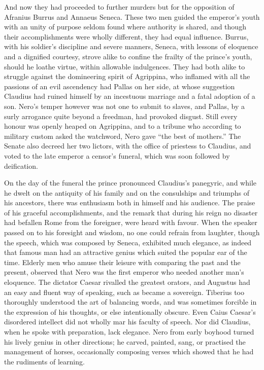 
And now they had proceeded to further murders but for the opposition of Afranius Burrus and Annaeus Seneca. These two men guided the emperor's youth with an unity of purpose seldom found where authority is shared, and though their accomplishments were wholly different, they had equal influence. Burrus, with his soldier's discipline and severe manners, Seneca, with lessons of eloquence and a dignified courtesy, strove alike to confine the frailty of the prince's youth, should he loathe virtue, within allowable indulgences. They had both alike to struggle against the domineering spirit of Agrippina, who inflamed with all the passions of an evil ascendency had Pallas on her side, at whose suggestion Claudius had ruined himself by an incestuous marriage and a fatal adoption of a son. Nero's temper however was not one to submit to slaves, and Pallas, by a surly arrogance quite beyond a freedman, had provoked disgust. Still every honour was openly heaped on Agrippina, and to a tribune who according to military custom asked the watchword, Nero gave ``the best of mothers.'' The Senate also decreed her two lictors, with the office of priestess to Claudius, and voted to the late emperor a censor's funeral, which was soon followed by deification.


On the day of the funeral the prince pronounced Claudius's panegyric, and while he dwelt on the antiquity of his family and on the consulships and triumphs of his ancestors, there was enthusiasm both in himself and his audience. The praise of his graceful accomplishments, and the remark that during his reign no disaster had befallen Rome from the foreigner, were heard with favour. When the speaker passed on to his foresight and wisdom, no one could refrain from laughter, though the speech, which was composed by Seneca, exhibited much elegance, as indeed that famous man had an attractive genius which suited the popular ear of the time. Elderly men who amuse their leisure with comparing the past and the present, observed that Nero was the first emperor who needed another man's eloquence. The dictator Caesar rivalled the greatest orators, and Augustus had an easy and fluent way of speaking, such as became a sovereign. Tiberius too thoroughly understood the art of balancing words, and was sometimes forcible in the expression of his thoughts, or else intentionally obscure. Even Caius Caesar's disordered intellect did not wholly mar his faculty of speech. Nor did Claudius, when he spoke with preparation, lack elegance. Nero from early boyhood turned his lively genius in other directions; he carved, painted, sang, or practised the management of horses, occasionally composing verses which showed that he had the rudiments of learning.

